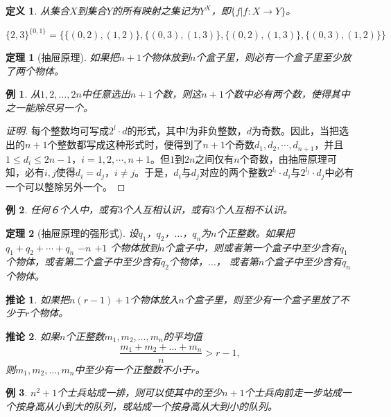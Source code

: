 \documentclass{article}
\newtheorem{Def}{定义}
\newtheorem{Thm}{定理}
\newtheorem{Cor}{推论}
\newtheorem*{Example}{例}
\begin{document}
\begin{CJK*}{UTF8}{gbsn}

  \begin{Def}
    从集合$X$到集合$Y$的所有映射之集记为$Y^X$，即$\{f|f:X\to Y\}$。
  \end{Def}

  
$\{2,3\}^{\{0,1\}} = \{\{(0,2),(1,2)\},\{(0,3),(1,3)\},\{(0,2),(1,3)\},\{(0,3),(1,2)\}\}$

    \begin{Thm}[抽屉原理]
    如果把$n+1$个物体放到$n$个盒子里，则必有一个盒子里至少放了两个物体。
  \end{Thm}
  \begin{Example}
    从$1,2,\ldots, 2n$中任意选出$n+1$个数，则这$n+1$个数中必有两个数，使得其中之一能除尽另一个。
  \end{Example}
  \begin{proof}[证明]
  每个整数均可写成$2^l\cdot d$的形式，其中$l$为非负整数，$d$为奇数。因此，当把选出的$n+1$个整数都写成这种形式时，便得到了$n+1$个奇数$d_1,d_2,\cdots, d_{n+1}$，并且$1\leq d_i \leq 2n -1$，$i=1,2,\cdots, n+1$。但$1$到$2n$之间仅有$n$个奇数，由抽屉原理可知，必有$i,j$使得$d_i=d_j$，$i\neq j$。于是，$d_i$与$d_j$对应的两个整数$2^{l_i}\cdot {d_i}$与$2^{l_j}\cdot {d_j}$中必有一个可以整除另外一个。
  \end{proof}

 \begin{Example}
    任何６个人中，或有$3$个人互相认识，或有$3$个人互相不认识。
  \end{Example}

    \begin{Thm}[抽屉原理的强形式]
    设$q_1$，$q_2$，$\ldots$，$q_n$为$n$个正整数。如果把 $q_1 + q_2 + \cdots + q_n$  $- n$ $ + 1$ 个物体放到$n$个盒子中，则或者第一个盒子中至少含有$q_1$个物体，或者第二个盒子中至少含有$q_2$个物体，$\ldots$，
    或者第$n$个盒子中至少含有$q_n$个物体。
  \end{Thm}
  \begin{Cor}
    如果把$n(r-1) + 1$个物体放入$n$个盒子里，则至少有一个盒子里放了不少于$r$个物体。
  \end{Cor}
  \begin{Cor}
    如果$n$个正整数$m_1, m_2, \ldots, m_n$的平均值\[\frac{m_1 + m_2 + \ldots + m_n}{n} > r - 1,\] 则$m_1, m_2, \ldots, m_n$中至少有一个正整数不小于$r$。
  \end{Cor}
 
  \begin{Example}
    $n^2+1$个士兵站成一排，则可以使其中的至少$n+1$个士兵向前走一步站成一个按身高从小到大的队列，或站成一个按身高从大到小的队列。
  \end{Example}


\end{CJK*}
\end{document}
